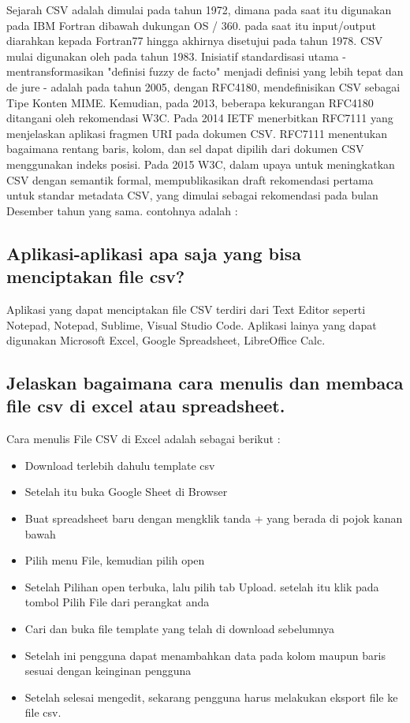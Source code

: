 	Sejarah CSV adalah  dimulai pada tahun 1972, dimana pada saat itu digunakan pada IBM Fortran dibawah dukungan OS / 360. pada saat itu input/output diarahkan kepada Fortran77 hingga akhirnya disetujui pada tahun 1978. CSV mulai digunakan oleh pada tahun 1983. Inisiatif standardisasi utama - mentransformasikan "definisi fuzzy de facto" menjadi definisi yang lebih tepat dan de jure - adalah pada tahun 2005, dengan RFC4180, mendefinisikan CSV sebagai Tipe Konten MIME. Kemudian, pada 2013, beberapa kekurangan RFC4180 ditangani oleh rekomendasi W3C. Pada 2014 IETF menerbitkan RFC7111 yang menjelaskan aplikasi fragmen URI pada dokumen CSV. RFC7111 menentukan bagaimana rentang baris, kolom, dan sel dapat dipilih dari dokumen CSV menggunakan indeks posisi. Pada 2015 W3C, dalam upaya untuk meningkatkan CSV dengan semantik formal, mempublikasikan draft rekomendasi pertama untuk standar metadata CSV, yang dimulai sebagai rekomendasi pada bulan Desember tahun yang sama.
contohnya adalah :


\subsection{Aplikasi-aplikasi apa saja yang bisa menciptakan file csv?}
Aplikasi yang dapat menciptakan file CSV terdiri dari Text Editor seperti Notepad, Notepad, Sublime, Visual Studio Code. Aplikasi lainya yang dapat digunakan Microsoft Excel, Google Spreadsheet, LibreOffice Calc.

\subsection{Jelaskan bagaimana cara menulis dan membaca file csv di excel atau spreadsheet.}
Cara menulis File CSV di Excel adalah sebagai berikut :
	\begin{itemize}
	\item Download terlebih dahulu template csv
	\item Setelah itu buka Google Sheet di Browser
	\item Buat spreadsheet baru dengan mengklik tanda + yang berada di pojok kanan bawah
	\item Pilih menu File, kemudian pilih open
	\item Setelah Pilihan open terbuka, lalu pilih tab Upload. setelah itu klik pada tombol Pilih File dari perangkat anda
	\item Cari dan buka file template yang telah di download sebelumnya
	\item Setelah ini pengguna dapat menambahkan data pada kolom maupun baris sesuai dengan keinginan pengguna
	\item Setelah selesai mengedit, sekarang pengguna harus melakukan eksport file ke file csv.
	\end{itemize}

